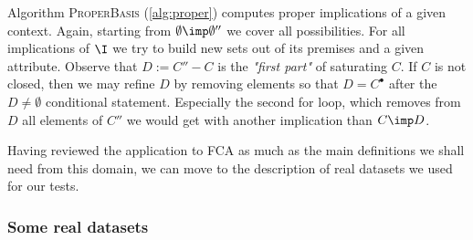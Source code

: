 \vspace{1.2em}

Algorithm \textsc{ProperBasis} (\ref{alg:proper}) computes proper implications of a given context. Again, starting from $\emptyset \imp \emptyset''$ we cover all possibilities. For all implications of $\I$ we try to build new sets out of
its premises and a given attribute. Observe that $D := C'' - C$ is the \textit{"first part"} of saturating $C$. If $C$ is not closed, then we may refine $D$ by removing elements so that $D = C^{\bullet}$ after the $D \neq \emptyset$ conditional statement. Especially the second for loop, which removes
from $D$ all elements of $C''$ we would get with another implication than $C \imp D$.

\vspace{1.2em}

Having reviewed the application to FCA as much as the main definitions we shall need from this domain, we can move to the description of real datasets we used for our tests.




\subsubsection{Some real datasets}

